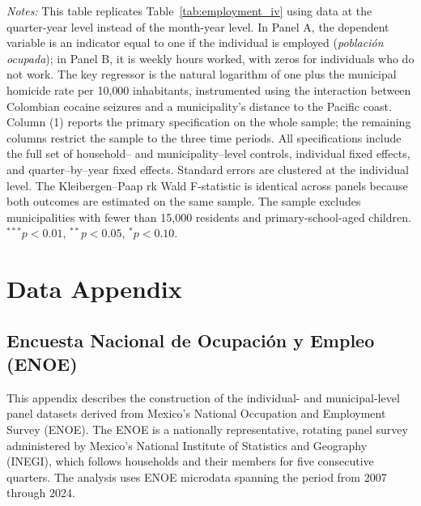 \documentclass[12pt,letter,english,intoc,bibliography=totoc,index=totoc,BCOR10mm,captions=tableheading,nottitlepage,fleqn]{article}
\theoremstyle{break}
\begin{document}
\begin{table}[H]
\centering
\caption{Quarterly Adolescent Employment Estimates}
\label{tab:employment_quarterly}
\centering
\scriptsize

\begin{minipage}{0.95\linewidth}
    \scriptsize \singlespacing
    \textit{Notes:} This table replicates Table~\ref{tab:employment_iv} using data at the quarter-year level instead of the month-year level. In Panel A, the dependent variable is an indicator equal to one if the individual is employed (\textit{poblaci\'{o}n ocupada}); in Panel B, it is weekly hours worked, with zeros for individuals who do not work. The key regressor is the natural logarithm of one plus the municipal homicide rate per 10{,}000 inhabitants, instrumented using the interaction between Colombian cocaine seizures and a municipality's distance to the Pacific coast. Column (1) reports the primary specification on the whole sample; the remaining columns restrict the sample to the three time periods. All specifications include the full set of household-- and municipality--level controls, individual fixed effects, and quarter--by--year fixed effects. Standard errors are clustered at the individual level. The Kleibergen--Paap rk Wald F-statistic is identical across panels because both outcomes are estimated on the same sample. The sample excludes municipalities with fewer than 15{,}000 residents and primary-school-aged children. $^{***}p<0.01$, $^{**}p<0.05$, $^{*}p<0.10$.
    \end{minipage}
\end{table}

\section{Data Appendix}
\label{sec:data_appendix}

\subsection{Encuesta Nacional de Ocupaci\'{o}n y Empleo (ENOE)}

This appendix describes the construction of the individual- and municipal-level panel datasets derived from Mexico's National Occupation and Employment Survey (ENOE). The ENOE is a nationally representative, rotating panel survey administered by Mexico's National Institute of Statistics and Geography (INEGI), which follows households and their members for five consecutive quarters. The analysis uses ENOE microdata spanning the period from 2007 through 2024.
\end{document}
